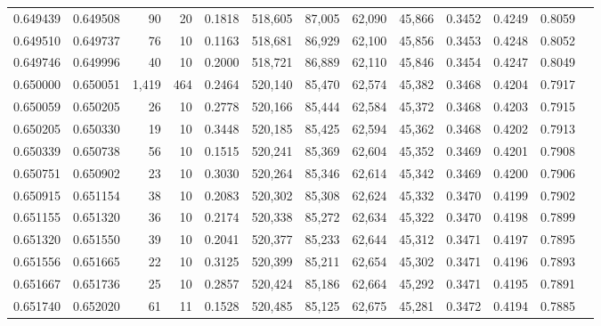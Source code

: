\begin{tabular}{rrrrrrrrrrrrr}
0.649439 & 0.649508 &    90 &  20 &                                     0.1818 & 518,605 &  87,005 &  62,090 &  45,866 & 0.3452 & 0.4249 & 0.8059 \\
0.649510 & 0.649737 &    76 &  10 &                                     0.1163 & 518,681 &  86,929 &  62,100 &  45,856 & 0.3453 & 0.4248 & 0.8052 \\
0.649746 & 0.649996 &    40 &  10 &                                     0.2000 & 518,721 &  86,889 &  62,110 &  45,846 & 0.3454 & 0.4247 & 0.8049 \\
0.650000 & 0.650051 & 1,419 & 464 &                                     0.2464 & 520,140 &  85,470 &  62,574 &  45,382 & 0.3468 & 0.4204 & 0.7917 \\
0.650059 & 0.650205 &    26 &  10 &                                     0.2778 & 520,166 &  85,444 &  62,584 &  45,372 & 0.3468 & 0.4203 & 0.7915 \\
0.650205 & 0.650330 &    19 &  10 &                                     0.3448 & 520,185 &  85,425 &  62,594 &  45,362 & 0.3468 & 0.4202 & 0.7913 \\
0.650339 & 0.650738 &    56 &  10 &                                     0.1515 & 520,241 &  85,369 &  62,604 &  45,352 & 0.3469 & 0.4201 & 0.7908 \\
0.650751 & 0.650902 &    23 &  10 &                                     0.3030 & 520,264 &  85,346 &  62,614 &  45,342 & 0.3469 & 0.4200 & 0.7906 \\
0.650915 & 0.651154 &    38 &  10 &                                     0.2083 & 520,302 &  85,308 &  62,624 &  45,332 & 0.3470 & 0.4199 & 0.7902 \\
0.651155 & 0.651320 &    36 &  10 &                                     0.2174 & 520,338 &  85,272 &  62,634 &  45,322 & 0.3470 & 0.4198 & 0.7899 \\
0.651320 & 0.651550 &    39 &  10 &                                     0.2041 & 520,377 &  85,233 &  62,644 &  45,312 & 0.3471 & 0.4197 & 0.7895 \\
0.651556 & 0.651665 &    22 &  10 &                                     0.3125 & 520,399 &  85,211 &  62,654 &  45,302 & 0.3471 & 0.4196 & 0.7893 \\
0.651667 & 0.651736 &    25 &  10 &                                     0.2857 & 520,424 &  85,186 &  62,664 &  45,292 & 0.3471 & 0.4195 & 0.7891 \\
0.651740 & 0.652020 &    61 &  11 &                                     0.1528 & 520,485 &  85,125 &  62,675 &  45,281 & 0.3472 & 0.4194 & 0.7885 \\

\end{tabular}
